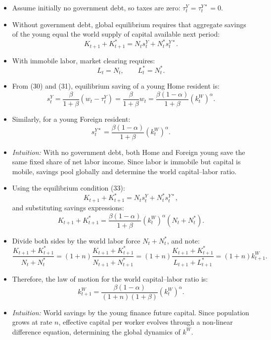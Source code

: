 \documentclass[12pt]{article}
\begin{document}
\begin{itemize}
  \item Assume initially no government debt, so taxes are zero: $\tau_t^Y = \tau_t^{Y*} = 0$.

  \item Without government debt, global equilibrium requires that aggregate savings of the young equal the world supply of capital available next period:
  \[
  K_{t+1} + K_{t+1}^* = N_t s_t^Y + N_t^* s_t^{Y*}. \tag{33}
  \]

  \item With immobile labor, market clearing requires:
  \[
  L_t = N_t, 
  \qquad 
  L_t^* = N_t^*.
  \]

  \item From (30) and (31), equilibrium saving of a young Home resident is:
  \[
  s_t^Y = \frac{\beta}{1+\beta}(w_t - \tau_t^Y) 
         = \frac{\beta}{1+\beta}w_t 
         = \frac{\beta (1-\alpha)}{1+\beta}(k_t^W)^{\alpha}.
  \]

  \item Similarly, for a young Foreign resident:
  \[
  s_t^{Y*} = \frac{\beta (1-\alpha)}{1+\beta}(k_t^W)^{\alpha}.
  \]

  \item \textit{Intuition:} With no government debt, both Home and Foreign young save the same fixed share of net labor income. Since labor is immobile but capital is mobile, savings pool globally and determine the world capital–labor ratio.
\end{itemize}

\begin{itemize}
  \item Using the equilibrium condition (33):
  \[
  K_{t+1} + K_{t+1}^* = N_t s_t^Y + N_t^* s_t^{Y*},
  \]
  and substituting savings expressions:
  \[
  K_{t+1} + K_{t+1}^* = \frac{\beta (1-\alpha)}{1+\beta}(k_t^W)^{\alpha}(N_t + N_t^*).
  \]

  \item Divide both sides by the world labor force $N_t + N_t^*$, and note:
  \[
  \frac{K_{t+1} + K_{t+1}^*}{N_t + N_t^*} 
  = (1+n)\frac{K_{t+1} + K_{t+1}^*}{N_{t+1}+N_{t+1}^*} 
  = (1+n)\frac{K_{t+1} + K_{t+1}^*}{L_{t+1}+L_{t+1}^*} 
  = (1+n)k_{t+1}^W.
  \]

  \item Therefore, the law of motion for the world capital–labor ratio is:
  \[
  k_{t+1}^W = \frac{\beta (1-\alpha)}{(1+n)(1+\beta)}(k_t^W)^{\alpha}. \tag{34}
  \]

  \item \textit{Intuition:} World savings by the young finance future capital. Since population grows at rate $n$, effective capital per worker evolves through a non-linear difference equation, determining the global dynamics of $k^W$.
\end{itemize}
\end{document}
